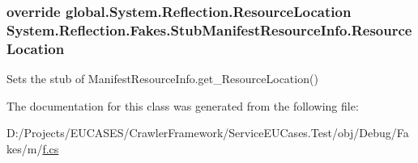 \hypertarget{class_system_1_1_reflection_1_1_fakes_1_1_stub_manifest_resource_info_a2131b7ae9041b7cf33849d9cb3286780}{
\subsubsection[{Resource\-Location}]{\setlength{\rightskip}{0pt plus 5cm}override global.\-System.\-Reflection.\-Resource\-Location System.\-Reflection.\-Fakes.\-Stub\-Manifest\-Resource\-Info.\-Resource\-Location\hspace{0.3cm}{\ttfamily [get]}}}\label{class_system_1_1_reflection_1_1_fakes_1_1_stub_manifest_resource_info_a2131b7ae9041b7cf33849d9cb3286780}


Sets the stub of Manifest\-Resource\-Info.\-get\-\_\-\-Resource\-Location()



The documentation for this class was generated from the following file\-:\begin{DoxyCompactItemize}
\item 
D\-:/\-Projects/\-E\-U\-C\-A\-S\-E\-S/\-Crawler\-Framework/\-Service\-E\-U\-Cases.\-Test/obj/\-Debug/\-Fakes/m/\hyperlink{m_2f_8cs}{f.\-cs}\end{DoxyCompactItemize}
